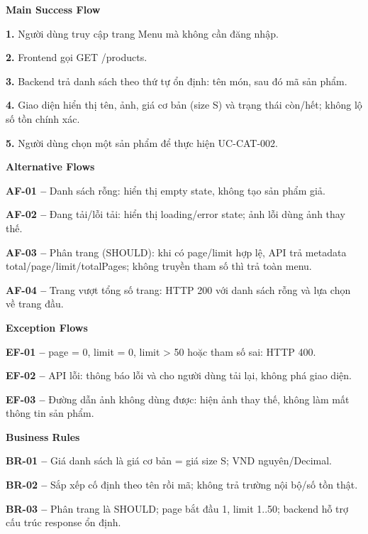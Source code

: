 \documentclass[11pt,a4paper,oneside]{report}
\begin{document}
\par\smallskip\noindent\textcolor{sgublue}{\textbf{Main Success Flow}}\par\nobreak
\textbf{1.} Người dùng truy cập trang Menu mà không cần đăng nhập.

\textbf{2.} Frontend gọi GET /products.

\textbf{3.} Backend trả danh sách theo thứ tự ổn định: tên món, sau đó mã sản phẩm.

\textbf{4.} Giao diện hiển thị tên, ảnh, giá cơ bản (size S) và trạng thái còn/hết; không lộ số tồn chính xác.

\textbf{5.} Người dùng chọn một sản phẩm để thực hiện UC-CAT-002.
\par

\par\smallskip\noindent\textcolor{sgublue}{\textbf{Alternative Flows}}\par\nobreak
\textbf{AF-01 --} Danh sách rỗng: hiển thị empty state, không tạo sản phẩm giả.

\textbf{AF-02 --} Đang tải/lỗi tải: hiển thị loading/error state; ảnh lỗi dùng ảnh thay thế.

\textbf{AF-03 --} Phân trang (SHOULD): khi có page/limit hợp lệ, API trả metadata total/page/limit/totalPages; không truyền tham số thì trả toàn menu.

\textbf{AF-04 --} Trang vượt tổng số trang: HTTP 200 với danh sách rỗng và lựa chọn về trang đầu.
\par

\par\smallskip\noindent\textcolor{sgublue}{\textbf{Exception Flows}}\par\nobreak
\textbf{EF-01 --} page = 0, limit = 0, limit \textgreater{} 50 hoặc tham số sai: HTTP 400.

\textbf{EF-02 --} API lỗi: thông báo lỗi và cho người dùng tải lại, không phá giao diện.

\textbf{EF-03 --} Đường dẫn ảnh không dùng được: hiện ảnh thay thế, không làm mất thông tin sản phẩm.
\par

\par\smallskip\noindent\textcolor{sgublue}{\textbf{Business Rules}}\par\nobreak
\textbf{BR-01 --} Giá danh sách là giá cơ bản = giá size S; VND nguyên/Decimal.

\textbf{BR-02 --} Sắp xếp cố định theo tên rồi mã; không trả trường nội bộ/số tồn thật.

\textbf{BR-03 --} Phân trang là SHOULD; page bắt đầu 1, limit 1..50; backend hỗ trợ cấu trúc response ổn định.
\end{document}
